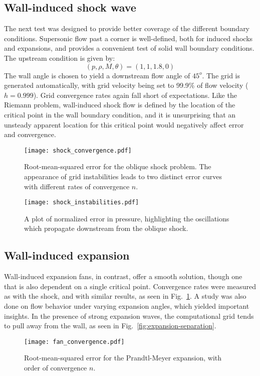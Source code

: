 \subsection{Wall-induced shock wave}
The next test was designed to provide better coverage of the different boundary conditions. Supersonic flow past a corner is well-defined, both for induced shocks and expansions, and provides a convenient test of solid wall boundary conditions. The upstream condition is given by:
\[
\left(p,\rho,M,\theta\right)=\left(1,1,1.8,0\right)
\]
The wall angle is chosen to yield a downstream flow angle of $45^o$. The grid is generated automatically, with grid velocity being set to 99.9\% of flow velocity ($h = 0.999$). Grid convergence rates again fall short of expectations. Like the Riemann problem, wall-induced shock flow is defined by the location of the critical point in the wall boundary condition, and it is unsurprising that an unsteady apparent location for this critical point would negatively affect error and convergence. 

\begin{figure}[p]
  \centering
  \caption{Root-mean-squared error for the oblique shock problem. The appearance of grid instabilities leads to two distinct error curves with different rates of convergence $n$.}
  \texttt{[image: shock\_convergence.pdf]} 
\end{figure}
\begin{figure}[p]
  \centering
  \caption{A plot of normalized error in pressure, highlighting the oscillations which propagate downstream from the oblique shock.}
  \texttt{[image: shock\_instabilities.pdf]}
\end{figure}

\subsection{Wall-induced expansion}
Wall-induced expansion fans, in contrast, offer a smooth solution, though one that is also dependent on a single critical point. Convergence rates were measured as with the shock, and with similar results, as seen in Fig.~\ref{fig:expansion-convergence}. A study was also done on flow behavior under varying expansion angles, which yielded important insights.  In the presence of strong expansion waves, the computational grid tends to pull away from the wall, as seen in Fig.~\ref{fig:expansion-separation}. 

\begin{figure}[p]
  \centering
  \texttt{[image: fan\_convergence.pdf]} 
  \caption{Root-mean-squared error for the Prandtl-Meyer expansion, with order of convergence $n$.}
  \label{fig:expansion-convergence}
\end{figure}

